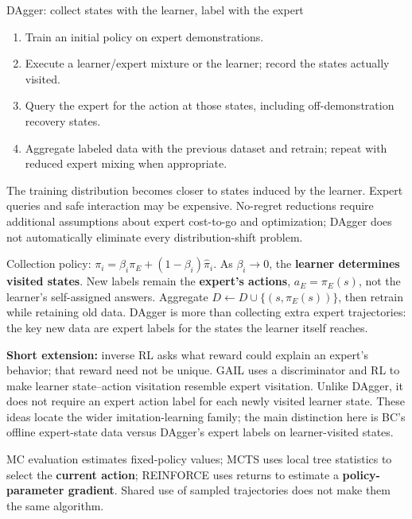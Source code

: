\documentclass[10pt,a4paper]{article}
\begin{document}
\begin{card}{DAgger: collect states with the learner, label with the expert}
\begin{enumerate}
\item Train an initial policy on expert demonstrations.
\item Execute a learner/expert mixture or the learner; record the states actually visited.
\item Query the expert for the action at those states, including off-demonstration recovery states.
\item Aggregate labeled data with the previous dataset and retrain; repeat with reduced expert mixing when appropriate.
\end{enumerate}
The training distribution becomes closer to states induced by the learner. Expert queries and safe interaction may be expensive. No-regret reductions require additional assumptions about expert cost-to-go and optimization; DAgger does not automatically eliminate every distribution-shift problem.
\end{card}

\begin{idea}
Collection policy: $\pi_i=\beta_i\pi_E+(1-\beta_i)\hat\pi_i$. As $\beta_i\to0$, the \textbf{learner determines visited states}. New labels remain the \textbf{expert's actions}, $a_E=\pi_E(s)$, not the learner's self-assigned answers.
Aggregate $D\leftarrow D\cup\{(s,\pi_E(s))\}$, then retrain while retaining old data. DAgger is more than collecting extra expert trajectories: the key new data are expert labels for the states the learner itself reaches.
\end{idea}

\begin{plain}
\textbf{Short extension:} inverse RL asks what reward could explain an expert's behavior; that reward need not be unique. GAIL uses a discriminator and RL to make learner state--action visitation resemble expert visitation. Unlike DAgger, it does not require an expert action label for each newly visited learner state. These ideas locate the wider imitation-learning family; the main distinction here is BC's offline expert-state data versus DAgger's expert labels on learner-visited states.
\end{plain}

\begin{note}
MC evaluation estimates fixed-policy values; MCTS uses local tree statistics to select the \textbf{current action}; REINFORCE uses returns to estimate a \textbf{policy-parameter gradient}. Shared use of sampled trajectories does not make them the same algorithm.
\end{note}
\end{document}
